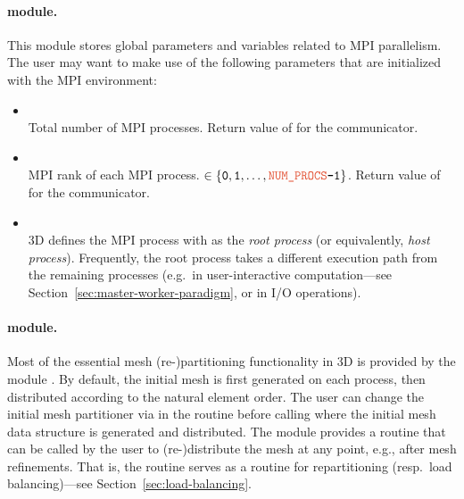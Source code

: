 \paragraph{ module.} This module stores global parameters and variables related to MPI parallelism. The user may want to make use of the following parameters that are initialized with the MPI environment:
\begin{itemize}
	\item {} \\
	Total number of MPI processes. Return value of  for the  communicator.
	\item {} \\
	MPI rank of each MPI process.  $\in \{ \code{0}, \code{1}, \dots, \code{\var{NUM\_PROCS}-1} \}$.
	Return value of  for the  communicator.
	\item {} \\
	\hp3D defines the MPI process with  as the \emph{root process} (or equivalently, \emph{host process}). Frequently, the root process takes a different execution path from the remaining processes (e.g.~in user-interactive computation---see Section~\ref{sec:master-worker-paradigm}, or in I/O operations).
\end{itemize}

\paragraph{ module.}
Most of the essential mesh (re-)partitioning functionality in \hp3D is provided by the module . By default, the initial mesh is first generated on each process, then distributed according to the natural element order. The user can change the initial mesh partitioner via  in the  routine before calling  where the initial mesh data structure is generated and distributed. The  module provides a  routine that can be called by the user to (re-)distribute the mesh at any point, e.g., after mesh refinements. That is, the  routine serves as a routine for repartitioning (resp.\ load balancing)---see Section~\ref{sec:load-balancing}.

